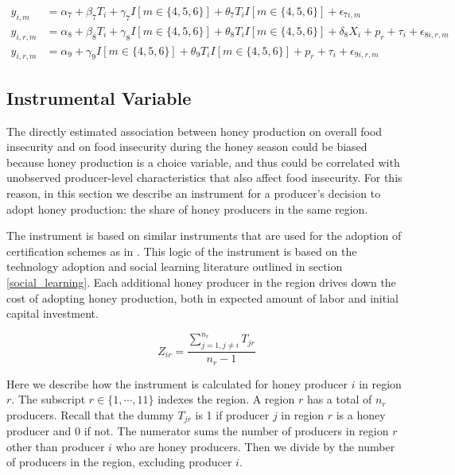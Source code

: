 \documentclass[../main.tex]{subfiles}
\begin{document}
\begin{align}
\label{eq:did_baseline}
y_{i,m} &= \alpha_7 + \beta_7 {T}_{i} + \gamma_7{I}[m \in \{4,5,6\}] + \theta_7{T}_{i}{I}[m \in \{4,5,6\}] + \epsilon_{7i,m} \\
\label{eq:did_controls}
y_{i,r,m} &= \alpha_8 + \beta_8 {T}_{i} + \gamma_8{I}[m \in \{4,5,6\}] + \theta_8{T}_{i}{I}[m \in \{4,5,6\}] + \delta_8 X_i + p_r + \tau_{i} + \epsilon_{8i,r,m} \\
\label{eq:did_fixed_effects}
y_{i,r,m} &= \alpha_9 + \gamma_9{I}[m \in \{4,5,6\}] + \theta_9{T}_{i}{I}[m \in \{4,5,6\}] + p_r + \tau_{i} + \epsilon_{9i,r,m} 
\end{align}

\subsection{Instrumental Variable}
The directly estimated association between honey production on overall food insecurity and on food insecurity during the honey season could be biased because honey production is a choice variable, and thus could be correlated with unobserved producer-level characteristics
that also affect food insecurity. For this reason, in this section
we describe an instrument for a producer's decision to adopt
honey production: the share of honey producers in the same region.

The instrument is based on similar instruments that are
used for the adoption of certification schemes as in
\textcite{sellareSustainabilityStandardsBenefit2020}. 
This logic of the instrument is based on the technology adoption and social learning literature outlined in section \ref{social_learning}. Each additional honey producer in the region drives down the cost of adopting honey production, both in expected amount of labor and initial capital investment. 

\begin{equation}
\label{eq:IV_honey_share}
Z_{ir} = \frac{\sum^{n_r}_{j=1,j\neq{i}}T_{jr}}{n_{r}-1}
\end{equation}

Here we describe how the instrument is calculated for honey producer
$i$ in region $r$. The subscript $r \in \{1,\cdots,11\}$ indexes the region. A region $r$ has a total of $n_r$ producers. Recall that the dummy $T_{jr}$ is 1 if producer $j$ in region $r$ is a honey producer and 0 if not. The numerator sums the number
of producers in region $r$ other than producer $i$ who
are honey producers. Then we divide by the number of producers in the region, excluding producer $i$. 
\end{document}
